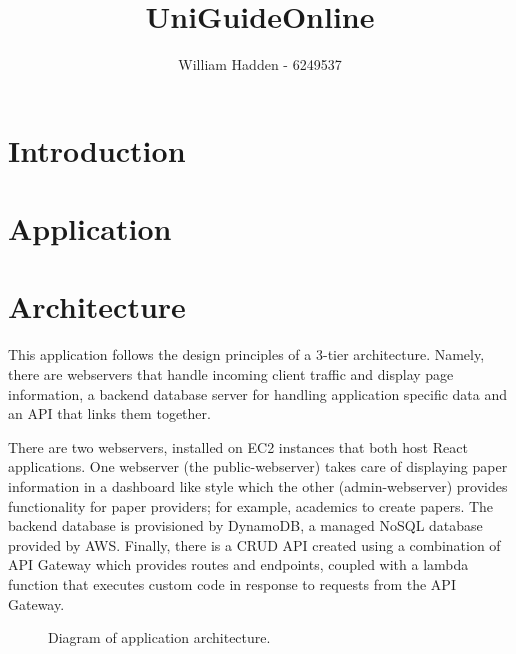 \documentclass[12pt]{article}
\begin{document}
\title{UniGuideOnline \\ }

\author{William Hadden - 6249537} 

\maketitle

\section*{Introduction}




\section*{Application}
\section{Architecture}

This application follows the design principles of a 3-tier architecture. Namely, there are webservers that handle incoming client traffic and display page information, a backend database server for handling application specific data and an API that links them together.

There are two webservers, installed on EC2 instances that both host React applications. One webserver (the public-webserver) takes care of displaying paper information in a dashboard like style which the other (admin-webserver) provides functionality for paper providers; for example, academics to create papers. The backend database is provisioned by DynamoDB, a managed NoSQL database provided by AWS. Finally, there is a CRUD API created using a combination of API Gateway which provides routes and endpoints, coupled with a lambda function that executes custom code in response to requests from the API Gateway. 

\begin{figure}
    \caption{Diagram of application architecture.}
    \label{fig: application_architecutre}
\end{figure}
\end{document}
